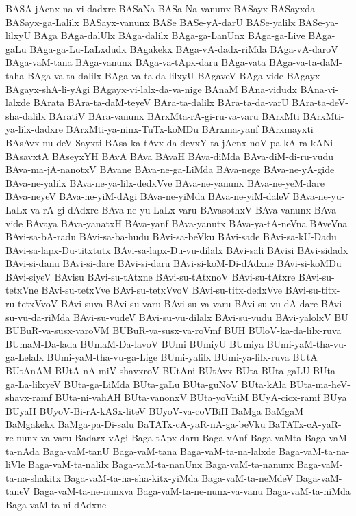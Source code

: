 {BASA-jAcnx-na-vi-dadxre
BASaNa
BASa-Na-vanunx
BASayx
BASayxda
BASayx-ga-Lalilx
BASayx-vanunx
BASe
BASe-yA-darU
BASe-yalilx
BASe-ya-lilxyU
BAga
BAga-dalUlx
BAga-dalilx
BAga-ga-LanUnx
BAga-ga-Live
BAga-gaLu
BAga-ga-Lu-LaLxdudx
BAgakekx
BAga-vA-dadx-riMda
BAga-vA-daroV
BAga-vaM-tana
BAga-vanunx
BAga-va-tApx-daru
BAga-vata
BAga-va-ta-daM-taha
BAga-va-ta-dalilx
BAga-va-ta-da-lilxyU
BAgaveV
BAga-vide
BAgayx
BAgayx-shA-li-yAgi
BAgayx-vi-lalx-da-va-nige
BAnaM
BAna-vidudx
BAna-vi-lalxde
BArata
BAra-ta-daM-teyeV
BAra-ta-dalilx
BAra-ta-da-varU
BAra-ta-deV-sha-dalilx
BAratiV
BAra-vanunx
BArxMta-rA-gi-ru-va-varu
BArxMti
BArxMti-ya-lilx-dadxre
BArxMti-ya-ninx-TuTx-koMDu
BArxma-yanf
BArxmayxti
BAsAvx-nu-deV-Sayxti
BAsa-ka-tAvx-da-devxY-ta-jAcnx-noV-pa-kA-ra-kANi
BAsavxtA
BAseyxYH
BAvA
BAva
BAvaH
BAva-diMda
BAva-diM-di-ru-vudu
BAva-ma-jA-nanotxV
BAvane
BAva-ne-ga-LiMda
BAva-nege
BAva-ne-yA-gide
BAva-ne-yalilx
BAva-ne-ya-lilx-dedxVve
BAva-ne-yanunx
BAva-ne-yeM-dare
BAva-neyeV
BAva-ne-yiM-dAgi
BAva-ne-yiMda
BAva-ne-yiM-daleV
BAva-ne-yu-LaLx-va-rA-gi-dAdxre
BAva-ne-yu-LaLx-varu
BAvasothxV
BAva-vanunx
BAva-vide
BAvaya
BAva-yanatxH
BAva-yanf
BAva-yanutx
BAva-ya-tA-neVna
BAveVna
BAvi-sa-bA-radu
BAvi-sa-ba-hudu
BAvi-sa-beVku
BAvi-sade
BAvi-sa-kU-Dadu
BAvi-sa-lapx-Du-titxtutx
BAvi-sa-lapx-Du-vu-dilalx
BAvi-sali
BAvisi
BAvi-sidadx
BAvi-si-danu
BAvi-si-dare
BAvi-si-daru
BAvi-si-koM-Di-dAdxne
BAvi-si-koMDu
BAvi-siyeV
BAvisu
BAvi-su-tAtxne
BAvi-su-tAtxnoV
BAvi-su-tAtxre
BAvi-su-tetxVne
BAvi-su-tetxVve
BAvi-su-tetxVvoV
BAvi-su-titx-dedxVve
BAvi-su-titx-ru-tetxVvoV
BAvi-suva
BAvi-su-varu
BAvi-su-va-varu
BAvi-su-vu-dA-dare
BAvi-su-vu-da-riMda
BAvi-su-vudeV
BAvi-su-vu-dilalx
BAvi-su-vudu
BAvi-yalolxV
BU
BUBuR-va-susx-varoVM
BUBuR-va-susx-va-roVmf
BUH
BUloV-ka-da-lilx-ruva
BUmaM-Da-lada
BUmaM-Da-lavoV
BUmi
BUmiyU
BUmiya
BUmi-yaM-tha-vu-ga-Lelalx
BUmi-yaM-tha-vu-ga-Lige
BUmi-yalilx
BUmi-ya-lilx-ruva
BUtA
BUtAnAM
BUtA-nA-miV-shavxroV
BUtAni
BUtAvx
BUta
BUta-gaLU
BUta-ga-La-lilxyeV
BUta-ga-LiMda
BUta-gaLu
BUta-guNoV
BUta-kAla
BUta-ma-heV-shavx-ramf
BUta-ni-vahAH
BUta-vanonxV
BUta-yoVniM
BUyA-cicx-ramf
BUya
BUyaH
BUyoV-Bi-rA-kASx-liteV
BUyoV-va-coVBiH
BaMga
BaMgaM
BaMgakekx
BaMga-pa-Di-salu
BaTATx-cA-yaR-nA-ga-beVku
BaTATx-cA-yaR-re-nunx-va-varu
Badarx-vAgi
Baga-tApx-daru
Baga-vAnf
Baga-vaMta
Baga-vaM-ta-nAda
Baga-vaM-tanU
Baga-vaM-tana
Baga-vaM-ta-na-lalxde
Baga-vaM-ta-na-liVle
Baga-vaM-ta-nalilx
Baga-vaM-ta-nanUnx
Baga-vaM-ta-nanunx
Baga-vaM-ta-na-shakitx
Baga-vaM-ta-na-sha-kitx-yiMda
Baga-vaM-ta-neMdeV
Baga-vaM-taneV
Baga-vaM-ta-ne-nunxva
Baga-vaM-ta-ne-nunx-va-vanu
Baga-vaM-ta-niMda
Baga-vaM-ta-ni-dAdxne
}
